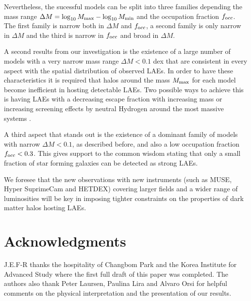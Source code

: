 \documentclass[usenatbib]{mn2e}
\newcommand{\ly}{{\ifmmode{{\rm Ly}\alpha}\else{Ly$\alpha$~}\fi}}
\begin{document}
Nevertheless, the sucessful models can be split into three families
depending the mass range $\Delta M=\log_{10}M_{\rm max} -
\log_{10}M_{\rm min}$ and the occupation fraction $f_{\rm occ}$. The
first family is narrow both in $\Delta M$ and $f_{\rm occ}$, a second
family is only narrow in $\Delta M$ and the third is narrow in $f_{\rm
  occ}$ and broad in $\Delta M$. 

 
A second results from our investigation is the existence
of a large number of models with a very narrow mass range $\Delta M<
0.1$ dex that are consistent in every aspect with the spatial
distribution of observed LAEs. In order to have these characteristics
it is required that halos around the mass $M_{\rm   max}$ for each
model become inefficient in hosting detectable LAEs. Two possible
ways to achieve this is having LAEs with a decreasing \ly escape
fraction with increasing mass or increasing screening effects by
neutral Hydrogen around the most massive systems
\citep{Laursen2009,ForeroRomero2011}.   

A third aspect that stands out is the existence of a dominant family
of models with narrow $\Delta M<0.1$, as described before, and also a
low occupation fraction $f_{\rm occ}<0.3$. This gives support to the
common wisdom stating that only a small fraction of star forming
galaxies can be detected as strong LAEs. 

We foresee that the new observations with new instruments (such as MUSE,
Hyper SuprimeCam and HETDEX) covering larger fields and a wider range
of luminosities will be key in imposing tighter constraints on the
properties of dark matter halos hosting LAEs.  


\section*{Acknowledgments} 
J.E.F-R thanks the hospitality of Changbom Park and the Korea
Institute for Advanced Study where the first full draft of this paper
was completed. The authors also thank Peter Laursen, Paulina Lira and
Alvaro Orsi for helpful comments on the physical interpretation and
the presentation of our results. 
\end{document}
